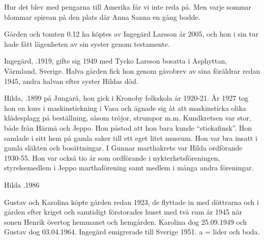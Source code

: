 Hur det blev med pengarna till Amerika får vi inte reda på. Men varje sommar blommar spirean på den plats där Anna Sanna en gång bodde.



%

%
Gården och tomten 0.12 ha köptes av Ingegärd Larsson år 2005, och hon i sin tur hade fått lägenheten av sin syster genom testamente.\jhvspace{}


%
Ingegärd, .1919, gifte sig 1949 med Tycko Larsson bosatta i Asphyttan, Värmland, Sverige. Halva gården fick hon genom gåvobrev av sina föräldrar redan 1945, andra halvan efter syster Hildas död.\jhvspace{}



%
Hilda, .1899 på Jungarå, hon gick i Kronoby folkskola år 1920-21. År 1927 tog hon en kurs i maskinstickning i Vasa och ägnade sig åt att maskinsticka olika klädesplagg på beställning, såsom tröjor, strumpor m.m. Kundkretsen var stor, både från Härmä och Jeppo. Hon påstod att hon bara kunde ``stickafinsk''. Hon samlade i sitt hem på gamla saker till ett eget litet museum. Hon var bra insatt i gamla släkten och bosättningar. I Gunnar marthakrets var Hilda ordförande 1930-55. Hon var också tio år som ordförande i nykterhetsföreningen, styrelsemedlem i Jeppo marthaförening samt medlem i många andra föreningar.

Hilda .1986


%
Gustav och Karolina köpte gården redan 1923, de flyttade in med döttrarna  och  i gården efter kriget och samtidigt förstorades huset med två rum år 1945 när sonen Henrik övertog hemmanet och hemgården. Karolina dog 25.09.1949 och Gustav dog 03.04.1964. Ingegärd emigrerade till Sverige 1951.  a = lider och 	boda.


